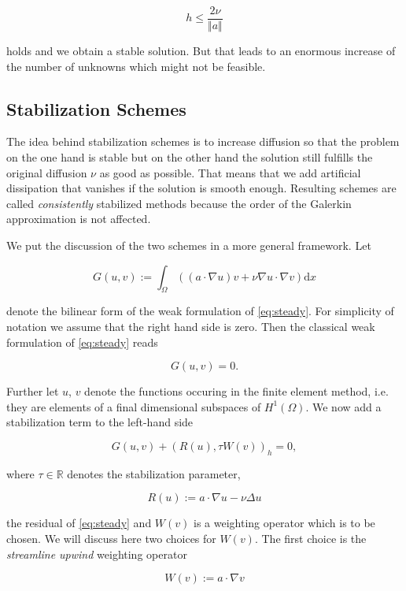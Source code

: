 \documentclass[a4paper, 11pt, twoside]{article}
\newcommand{\dd}{\mathrm{d}}
\begin{document}
	\[h \leq \frac{2\nu}{\Vert a \Vert}\]

holds and we obtain a stable solution. But that leads to an enormous increase of the number of unknowns which might not be feasible.

\subsection{Stabilization Schemes}\label{sec:stabilizationschemes}

The idea behind stabilization schemes is to increase diffusion so that the problem on the one hand is stable but on the other hand the solution still fulfills the original diffusion $\nu$ as good as possible. That means that we add artificial dissipation that vanishes if the solution is smooth enough. Resulting schemes are called \emph{consistently} stabilized methods because the order of the Galerkin approximation is not affected.

We put the discussion of the two schemes in a more general framework. Let

	\[G(u, v) := \int_{\Omega}\left(\left(a \cdot \nabla u\right)v + \nu \nabla u \cdot \nabla v \right)\dd x \]

denote the bilinear form of the weak formulation of \eqref{eq:steady}. For simplicity of notation we assume that the right hand side is zero. Then the classical weak formulation of \eqref{eq:steady} reads

	\[G(u, v) = 0.\]
	
Further let $u$, $v$ denote the functions occuring in the finite element method, i.e. they are elements of a final dimensional subspaces of $H^{1}(\Omega)$. We now add a stabilization term to the left-hand side

	\begin{equation}\label{stabilization}
		G(u, v) + \left(R(u), \tau W(v)\right)_{h} = 0,
	\end{equation}
	
where $\tau \in \mathbb{R}$ denotes the stabilization parameter,

	\[R(u) := a \cdot \nabla u - \nu \Delta u\]
	
the residual of \eqref{eq:steady} and $W(v)$ is a weighting operator which is to be chosen. We will discuss here two choices for $W(v)$. The first choice is the \emph{streamline upwind} weighting operator

	\begin{equation}\label{SUPG}
		W(v) := a \cdot \nabla v
	\end{equation}
\end{document}

